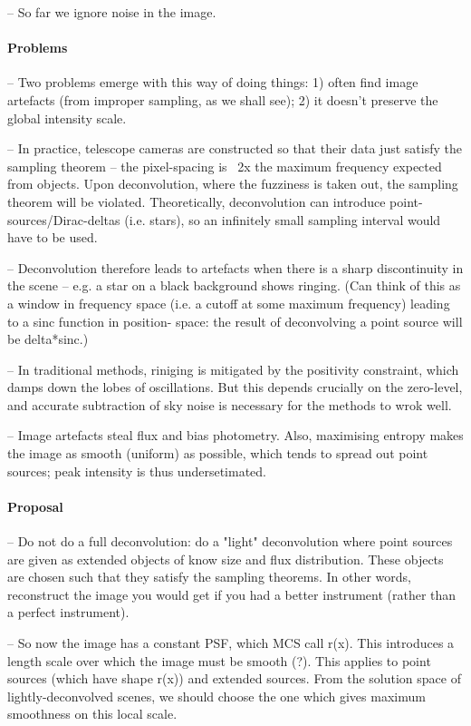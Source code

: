 \documentclass[letterpaper, 11pt]{article}
\begin{document}
-- So far we ignore noise in the image.

\paragraph{Problems}

-- Two problems emerge with this way of doing things: 1) often find image artefacts (from improper sampling, as we shall see); 2) it doesn't 
preserve the global intensity scale.

-- In practice, telescope cameras are constructed so that their data just satisfy the sampling theorem -- the pixel-spacing is ~2x the maximum 
frequency expected from objects. Upon deconvolution, where the fuzziness is taken out, the sampling theorem will be violated. Theoretically, 
deconvolution can introduce point-sources/Dirac-deltas (i.e. stars), so an infinitely small sampling interval would have to be used.

-- Deconvolution therefore leads to artefacts when there is a sharp discontinuity in the scene -- e.g. a star on a black background shows 
ringing. (Can think of this as a window in frequency space (i.e. a cutoff at some maximum frequency) leading to a sinc function in position-
space: the result of deconvolving a point source will be delta*sinc.)

-- In traditional methods, riniging is mitigated by the positivity 
constraint, which damps down the lobes of oscillations. But this depends crucially on the zero-level, and accurate subtraction of sky noise 
is necessary for the methods to wrok well.

-- Image artefacts steal flux and bias photometry. Also, maximising entropy makes the image as 
smooth (uniform) as possible, which tends to spread out point sources; peak intensity is thus undersetimated.


\paragraph{Proposal}

-- Do not do a full deconvolution: do a "light" deconvolution where point sources are given as extended objects of know size and flux 
distribution. These objects are chosen such that they satisfy the sampling theorems. In other words, reconstruct the image you would get if 
you had a better instrument (rather than a perfect instrument).

-- So now the image has a constant PSF, which MCS call r(x). This introduces a length scale over which the image must be smooth (?). This 
applies to point sources (which have shape r(x)) and extended sources. From the solution space of lightly-deconvolved scenes, we should 
choose the one which gives maximum smoothness on this local scale.
\end{document}
